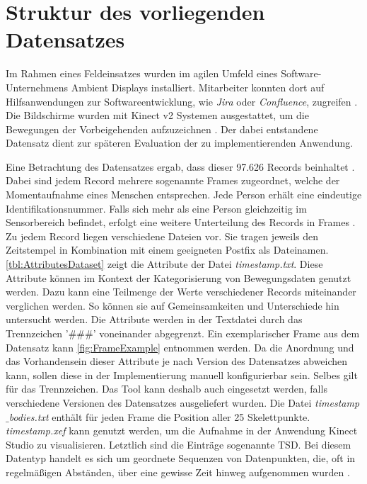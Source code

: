 \section{Struktur des vorliegenden Datensatzes}
\label{2-StrukturDatensatz}
Im Rahmen eines Feldeinsatzes wurden im agilen Umfeld eines Software-Unternehmens Ambient Displays installiert.
Mitarbeiter konnten dort auf Hilfsanwendungen zur Softwareentwicklung, wie \emph{Jira} oder \emph{Confluence}, zugreifen \citep{schwarzer_spontaneous_2021}.
Die Bildschirme wurden mit Kinect v2 Systemen ausgestattet,
um die Bewegungen der Vorbeigehenden aufzuzeichnen \citep{schwarzer_spontaneous_2021}.
Der dabei entstandene Datensatz dient zur späteren Evaluation der zu implementierenden Anwendung.

Eine Betrachtung des Datensatzes ergab, dass dieser 97.626 Records beinhaltet \citep{temiz_konzeption_2022}.
Dabei sind jedem Record mehrere sogenannte Frames zugeordnet,
welche der Momentaufnahme eines Menschen entsprechen.
Jede Person erhält eine eindeutige Identifikationsnummer.
Falls sich mehr als eine Person gleichzeitig im Sensorbereich befindet,
erfolgt eine weitere Unterteilung des Records in Frames \citep{temiz_konzeption_2022}.
Zu jedem Record liegen verschiedene Dateien vor.
Sie tragen jeweils den Zeitstempel in Kombination mit einem geeigneten Postfix als Dateinamen.
\autoref{tbl:AttributesDataset} zeigt die Attribute der Datei \emph{timestamp.txt}.
Diese Attribute können im Kontext der Kategorisierung von Bewegungsdaten genutzt werden.
Dazu kann eine Teilmenge der Werte verschiedener Records miteinander verglichen werden.
So können sie auf Gemeinsamkeiten und Unterschiede hin untersucht werden.
Die Attribute werden in der Textdatei durch das Trennzeichen '\#\#\#' voneinander abgegrenzt.
Ein exemplarischer Frame aus dem Datensatz kann \autoref{fig:FrameExample} entnommen werden.
Da die Anordnung und das Vorhandensein dieser Attribute je nach Version des Datensatzes abweichen kann,
sollen diese in der Implementierung manuell konfigurierbar sein.
Selbes gilt für das Trennzeichen.
Das Tool kann deshalb auch eingesetzt werden,
falls verschiedene Versionen des Datensatzes ausgeliefert wurden.
Die Datei \emph{timestamp$\_$bodies.txt} enthält für jeden Frame die Position aller 25 Skelettpunkte.
\emph{timestamp.xef} kann genutzt werden, um die Aufnahme in der Anwendung Kinect Studio zu visualisieren.
Letztlich sind die Einträge sogenannte \ac{TSD}.
Bei diesem Datentyp handelt es sich um geordnete Sequenzen von Datenpunkten,
die, oft in regelmäßigen Abständen, über eine gewisse Zeit hinweg aufgenommen wurden \citep{ali_clustering_2019}.
